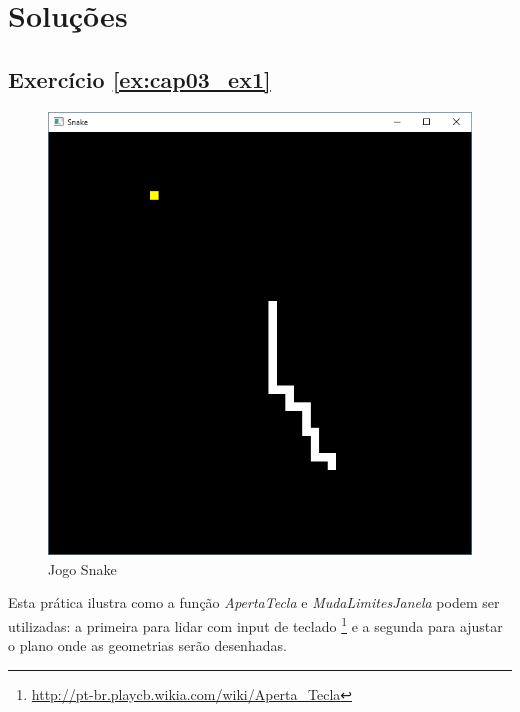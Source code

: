 \section*{Soluções}

\subsection*{Exercício \ref{ex:cap03_ex1} }
\begin{figure}[ht]
  \centerline{\includegraphics[width=.5\textwidth]{img/cap3_ex10.png}}
  \caption{Jogo Snake}
  \label{fig:cap03_ex1}
\end{figure}
Esta prática ilustra como a função \emph{ApertaTecla} e \emph{MudaLimitesJanela} podem ser utilizadas: a primeira para lidar com input de teclado \footnote{\url{http://pt-br.playcb.wikia.com/wiki/Aperta_Tecla}} e a segunda para ajustar o plano onde as geometrias serão desenhadas.

